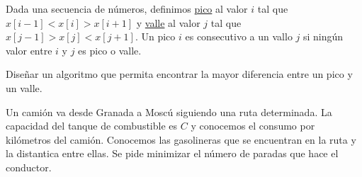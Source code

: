 \begin{ejercicio*}
    Dada una secuencia de números, definimos \ul{pico} al valor $i$ tal que $x[i-1] < x[i] > x[i+1]$ y \ul{valle} al valor $j$ tal que $x[j-1]>x[j]<x[j+1]$. Un pico $i$ es consecutivo a un vallo $j$ si ningún valor entre $i$ y $j$ es pico o valle.

    Diseñar un algoritmo que permita encontrar la mayor diferencia entre un pico y un valle.
\end{ejercicio*}

\begin{ejercicio*}
    Un camión va desde Granada a Moscú siguiendo una ruta determinada. La capacidad del tanque de combustible es $C$ y conocemos el consumo por kilómetros del camión. Conocemos las gasolineras que se encuentran en la ruta y la distantica entre ellas. Se pide minimizar el número de paradas que hace el conductor.


\end{ejercicio*}
